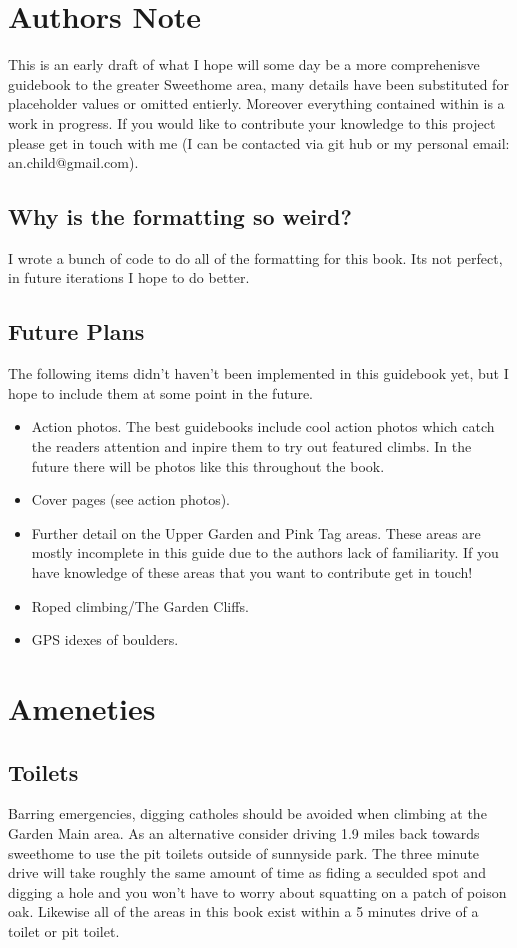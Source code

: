 \section{Authors Note}
This is an early draft of what I hope will some day be a more comprehenisve guidebook to the greater Sweethome area, many details have been substituted for placeholder values or omitted entierly. Moreover everything contained within is a work in progress. If you would like to contribute your knowledge to this project please get in touch with me (I can be contacted via git hub or my personal email: an.child@gmail.com).
\subsection*{Why is the formatting so weird?}
I wrote a bunch of code to do all of the formatting for this book. Its not perfect, in future iterations I hope to do better.
\subsection*{Future Plans}
The following items didn't haven't been implemented in this guidebook yet, but I hope to include them at some point in the future.
\begin{itemize}
\item Action photos. The best guidebooks include cool action photos which catch the readers attention and inpire them to try out featured climbs. In the future there will be photos like this throughout the book.\\
\item Cover pages (see action photos).\\
\item Further detail on the Upper Garden and Pink Tag areas. These areas are mostly incomplete in this guide due to the authors lack of familiarity. If you have knowledge of these areas that you want to contribute get in touch!\\
\item Roped climbing/The Garden Cliffs.\\
\item GPS idexes of boulders.\\
\end{itemize}
\section{Ameneties}
\subsection*{Toilets}
Barring emergencies, digging catholes should be avoided when climbing at the Garden Main area. As an alternative consider driving 1.9 miles back towards sweethome to use the pit toilets outside of sunnyside park. The three minute drive will take roughly the same amount of time as fiding a seculded spot and digging a hole and you won't have to worry about squatting on a patch of poison oak. Likewise all of the areas in this book exist within a 5 minutes drive of a toilet or pit toilet. 

